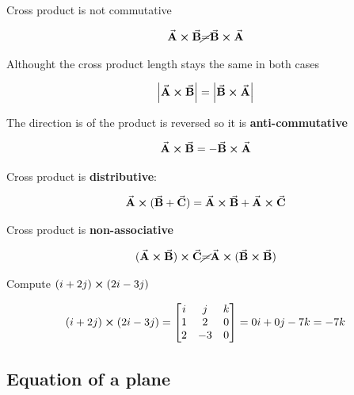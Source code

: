 \documentclass{article}
\begin{document}
    Cross product is not commutative

    \begin{align}
        \va{A} \cross \va{B} \cancel{=} \va{B} \cross \va{A}
    \end{align}

    Althought the cross product length stays the same in both cases

    \begin{align}
        \abs{\va{A} \cross \va{B}} =  \abs{\va{B} \cross \va{A}}
    \end{align}

    The direction is of the product is reversed so it is \textbf{anti-commutative}

    \begin{align}
        \va{A} \cross \va{B} = - \va{B} \cross \va{A}
    \end{align}

    Cross product is \textbf{distributive}:

    \begin{align}
        \va{A} \cross (\va{B} + \va{C}) = \va{A} \cross \va{B} + \va{A}\cross \va{C}
    \end{align}

    Cross product is \textbf{non-associative}

    \begin{align}
        (\va{A} \cross \va{B} ) \cross \va{C} \cancel{=} \va{A} \cross (\va{B} \cross \va{B})
    \end{align}

    \begin{problem}
        Compute $(i + 2j) \cross (2i - 3j)$

        \begin{align}
            (i + 2j) \cross (2i - 3j)
            =\bmqty{
            i & j & k \\
            1 & 2 & 0\\
            2 & -3 & 0
            }
            =0i + 0j -7k
            = -7k
        \end{align}
    \end{problem}

    \subsection{Equation of a plane}
\end{document}

